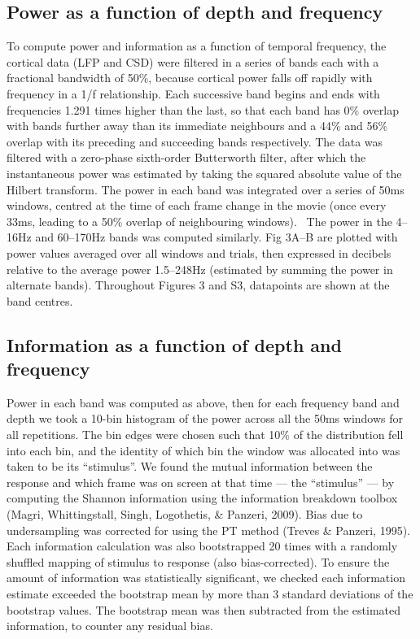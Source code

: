 \subsection[Power as a function of depth and frequency]{Power as a function of depth and frequency}
To compute power and information as a function of temporal frequency, the cortical data (\ac{LFP} and \ac{CSD}) were filtered in a series of bands each with a fractional bandwidth of 50\%, because cortical power falls off rapidly with frequency in a 1/f relationship.
Each successive band begins and ends with frequencies 1.291 times higher than the last, so that each band has 0\% overlap with bands further away than its immediate neighbours and a 44\% and 56\% overlap with its preceding and succeeding bands respectively.
The data was filtered with a zero-phase sixth-order Butterworth filter, after which the instantaneous power was estimated by taking the squared absolute value of the Hilbert transform.
The power in each band was integrated over a series of 50ms windows, centred at the time of each frame change in the movie (once every 33ms, leading to a 50\% overlap of neighbouring windows).
\ The power in the 4--16Hz and 60--170Hz bands was computed similarly.
Fig 3A--B are plotted with power values averaged over all windows and trials, then expressed in decibels relative to the average power 1.5--248Hz (estimated by summing the power in alternate bands).
Throughout Figures 3 and S3, datapoints are shown at the band centres.

\subsection{Information as a function of depth and frequency}
Power in each band was computed as above, then for each frequency band and depth we took a 10-bin histogram of the power across all the 50ms windows for all repetitions.
The bin edges were chosen such that 10\% of the distribution fell into each bin, and the identity of which bin the window was allocated into was taken to be its ``stimulus''.
We found the mutual information between the response and which frame was on screen at that time --- the ``stimulus'' --- by computing the Shannon information using the information breakdown toolbox (Magri, Whittingstall, Singh, Logothetis, \& Panzeri, 2009).
Bias due to undersampling was corrected for using the \ac{PT} method (Treves \& Panzeri, 1995).
Each information calculation was also bootstrapped 20 times with a randomly shuffled mapping of stimulus to response (also bias-corrected).
To ensure the amount of information was statistically significant, we checked each information estimate exceeded the bootstrap mean by more than 3 standard deviations of the bootstrap values.
The bootstrap mean was then subtracted from the estimated information, to counter any residual bias.

